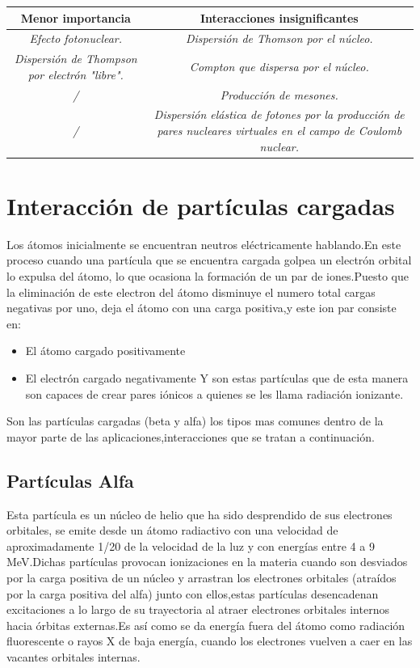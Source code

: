 \documentclass[12pt,fleqn]{book} %
\numberwithin{equation}{section} %
\numberwithin{figure}{section} %
\numberwithin{table}{section} %
\begin{document}
{\begin{center}
\begin{tabular}{|c|c|}\hline
\rowcolor{ocre!70}
\textbf{Menor importancia} & \textbf{Interacciones insignificantes}\\\hline
\textit{Efecto fotonuclear.} & \textit{Dispersión de Thomson por el núcleo.}\\\hline
\textit{Dispersión de Thompson por electrón "libre".} & \textit{Compton que dispersa por el núcleo.}\\\hline
\textit{/} & \textit{Producción de mesones.}\\\hline
\textit{/} & \textit{Dispersión elástica de fotones por la producción de pares nucleares virtuales en el campo de Coulomb nuclear.}\\\hline
\end{tabular}
\end{center}


\section{Interacción de partículas cargadas}
 Los átomos inicialmente se encuentran neutros eléctricamente hablando.En este proceso cuando una partícula que se encuentra cargada golpea un electrón orbital lo expulsa del átomo, lo que ocasiona la formación de un par de iones.Puesto que la eliminación de este electron del átomo disminuye el numero total cargas negativas por uno, deja el átomo con una carga positiva,y este ion par consiste en:
 
 \begin{itemize}
\item El átomo cargado positivamente
\item El electrón cargado negativamente
Y son estas partículas que de esta manera son  capaces de crear pares iónicos a quienes se les llama radiación ionizante. 
 \end{itemize}
Son las partículas cargadas (beta y alfa) los tipos mas comunes dentro de la mayor parte de las aplicaciones,interacciones que se tratan a continuación.


\subsection{Partículas Alfa}
Esta partícula es un núcleo de helio que ha sido desprendido de sus electrones orbitales, se emite desde un átomo radiactivo con una velocidad de aproximadamente 1/20 de la velocidad de la luz y con energías entre 4 a 9 MeV.Dichas partículas provocan ionizaciones en la materia cuando son desviados por la carga positiva de un núcleo y arrastran los electrones orbitales (atraídos por la carga positiva del alfa) junto con ellos,estas partículas desencadenan excitaciones a lo largo de su trayectoria al  
atraer electrones orbitales internos hacia órbitas externas.Es así como se da energía
fuera del átomo como radiación fluorescente o rayos X de baja energía, cuando los electrones vuelven a caer en las vacantes orbitales internas.

}
\end{document}
